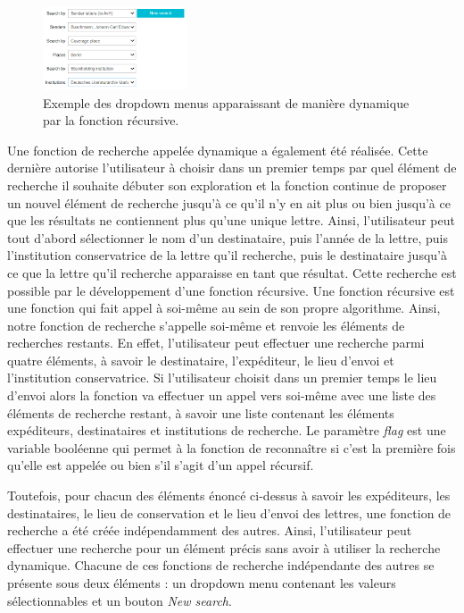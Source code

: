 \documentclass[a4paper, 12pt, twoside]{book}
\begin{document}
\begin{figure}
\includegraphics[width=0.38\textwidth]{img/recherche_dynamic.png}
\caption{Exemple des dropdown menus apparaissant de manière dynamique par la fonction récursive.}
\vspace{-10pt}
\end{figure}
Une fonction de recherche appelée dynamique a également été réalisée. Cette dernière autorise l'utilisateur à choisir dans un premier temps par quel élément de recherche il souhaite débuter son exploration et la fonction continue de proposer un nouvel élément de recherche jusqu'à ce qu'il n'y en ait plus ou bien jusqu'à ce que les résultats ne contiennent plus qu'une unique lettre. Ainsi, l'utilisateur peut tout d'abord sélectionner le nom d'un destinataire, puis l'année de la lettre, puis l'institution conservatrice de la lettre qu'il recherche, puis le destinataire jusqu'à ce que la lettre qu'il recherche apparaisse en tant que résultat. Cette recherche est possible par le développement d'une fonction récursive. Une fonction récursive est une fonction qui fait appel à soi-même au sein de son propre algorithme. Ainsi, notre fonction de recherche s'appelle soi-même et renvoie les éléments de recherches restants. En effet, l'utilisateur peut effectuer une recherche parmi quatre éléments, à savoir le destinataire, l'expéditeur, le lieu d'envoi et l'institution conservatrice. Si l'utilisateur choisit dans un premier temps le lieu d'envoi alors la fonction va effectuer un appel vers soi-même avec une liste des éléments de recherche restant, à savoir une liste contenant les éléments expéditeurs, destinataires et institutions de recherche. Le paramètre \textit{flag} est une variable booléenne qui permet à la fonction de reconnaître si c'est la première fois qu'elle est appelée ou bien s'il s'agit d'un appel récursif.

Toutefois, pour chacun des éléments énoncé ci-dessus à savoir les expéditeurs, les destinataires, le lieu de conservation et le lieu d'envoi des lettres, une fonction de recherche a été créée indépendamment des autres. Ainsi, l'utilisateur peut effectuer une recherche pour un élément précis sans avoir à utiliser la recherche dynamique. Chacune de ces fonctions de recherche indépendante des autres se présente sous deux éléments : un dropdown menu contenant les valeurs sélectionnables et un bouton \textit{New search}.
\end{document}
